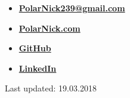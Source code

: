 \documentclass[11pt,oneside]{article}
\newcommand{\hhref}[2]{\href{#1}{\color{blue}#2}}
\begin{document}
\begin{itemize}
    
    \item{\textbf{\hhref{mailto:PolarNick239@gmail.com}{PolarNick239@gmail.com}}}
    
    \item{\textbf{\hhref{http://polarnick239.github.io}{PolarNick.com}}}
    
    \item{\textbf{\hhref{https://github.com/PolarNick239}{GitHub}}}
    
    \item{\textbf{\hhref{https://www.linkedin.com/in/nickolay-polyarniy-61393b7b}{LinkedIn}}}
    
    
    
\end{itemize}

Last updated: 19.03.2018
\end{document}
